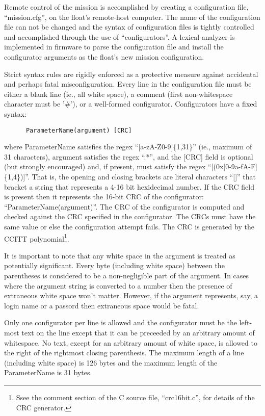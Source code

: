 Remote control of the mission is accomplished by creating a configuration
file, ``mission.cfg'', on the float's remote-host computer.  The name of the
configuration file can not be changed and the syntax of configuration files
is tightly controlled and accomplished through the use of ``configurators''.
A lexical analyzer is implemented in firmware to parse the configuration
file and install the configurator arguments as the float's new mission
configuration.

Strict syntax rules are rigidly enforced as a protective measure against
accidental and perhaps fatal misconfiguration.  Every line in the
configuration file must be either a blank line (ie., all white space), a
comment (first non-whitespace character must be '\#'), or a well-formed
configurator.  Configurators have a fixed syntax:

      \begin{verbatim}
      ParameterName(argument) [CRC]
      \end{verbatim}
  
where ParameterName satisfies the regex ``[a-zA-Z0-9]\{1,31\}'' (ie.,
maximum of 31 characters), argument satisfies the regex ``.*'', and the
[CRC] field is optional (but strongly encouraged) and, if present, must
satisfy the regex ``[(0x[0-9a-fA-F]\{1,4\})]''.  That is, the opening and
closing brackets are literal characters ``[]'' that bracket a string that
represents a 4-16 bit hexidecimal number.  If the CRC field is present then
it represents the 16-bit CRC of the configurator:
``ParameterName(argument)''.  The CRC of the configurator is computed and
checked against the CRC specified in the configurator.  The CRCs must have
the same value or else the configuration attempt fails.  The CRC is
generated by the CCITT polynomial\footnote{Ssee the comment section of the C
  source file, ``crc16bit.c'', for details of the CRC generator.}.

It is important to note that any white space in the argument is treated as
potentially significant.  Every byte (including white space) between the
parentheses is considered to be a non-negligible part of the argument.  In
cases where the argument string is converted to a number then the presence
of extraneous white space won't matter.  However, if the argument
represents, say, a login name or a passord then extraneous space would be
fatal.

Only one configurator per line is allowed and the configurator must be the
left-most text on the line except that it can be preceeded by an arbitrary
amount of whitespace.  No text, except for an arbitrary amount of white
space, is allowed to the right of the rightmost closing parenthesis.  The
maximum length of a line (including white space) is 126 bytes and the
maximum length of the ParameterName is 31 bytes.

